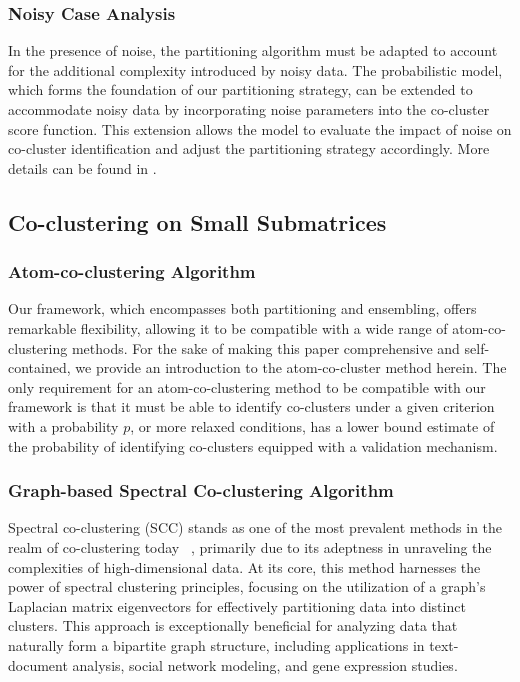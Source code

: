 \documentclass[journal]{IEEEtran}
\renewcommand{\cite}[1]{~\autocite{#1}}
\begin{document}
\subsubsection{Noisy Case Analysis}

In the presence of noise, the partitioning algorithm must be adapted to account for the additional complexity introduced by noisy data. The probabilistic model, which forms the foundation of our partitioning strategy, can be extended to accommodate noisy data by incorporating noise parameters into the co-cluster score function. This extension allows the model to evaluate the impact of noise on co-cluster identification and adjust the partitioning strategy accordingly. More details can be found in .
\subsection{Co-clustering on Small Submatrices}

\subsubsection{Atom-co-clustering Algorithm}

Our framework, which encompasses both partitioning and ensembling, offers remarkable flexibility, allowing it to be compatible with a wide range of atom-co-clustering methods. For the sake of making this paper comprehensive and self-contained, we provide an introduction to the atom-co-cluster method herein. The only requirement for an atom-co-clustering method to be compatible with our framework is that it must be able to identify co-clusters under a given criterion with a probability $p$, or more relaxed conditions, has a lower bound estimate of the probability of identifying co-clusters equipped with a validation mechanism.

\subsubsection{Graph-based Spectral Co-clustering Algorithm}

Spectral co-clustering (SCC) stands as one of the most prevalent methods in the realm of co-clustering today \cite{vonluxburg2007TutorialSpectralClustering}, primarily due to its adeptness in unraveling the complexities of high-dimensional data. At its core, this method harnesses the power of spectral clustering principles, focusing on the utilization of a graph's Laplacian matrix eigenvectors for effectively partitioning data into distinct clusters. This approach is exceptionally beneficial for analyzing data that naturally form a bipartite graph structure, including applications in text-document analysis, social network modeling, and gene expression studies.
\end{document}
